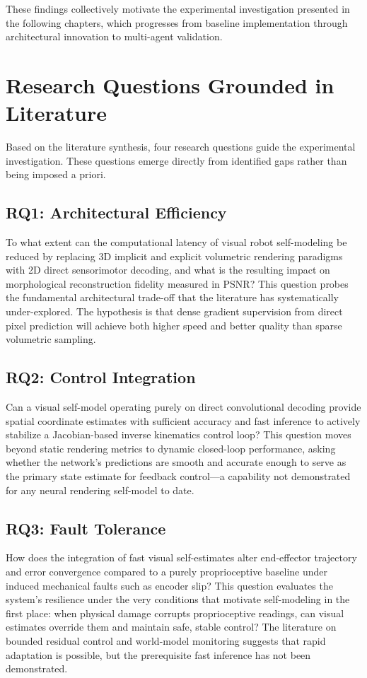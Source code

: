 \documentclass[12pt,a4paper,oneside]{report}
\begin{document}
These findings collectively motivate the experimental investigation presented in the following chapters, which progresses from baseline implementation through architectural innovation to multi-agent validation.
\section{Research Questions Grounded in Literature}

Based on the literature synthesis, four research questions guide the experimental investigation. These questions emerge directly from identified gaps rather than being imposed a priori.
\subsection{RQ1: Architectural Efficiency}
\label{subsec:rq1_architectural_efficiency}

To what extent can the computational latency of visual robot self-modeling be reduced by replacing 3D implicit and explicit volumetric rendering paradigms with 2D direct sensorimotor decoding, and what is the resulting impact on morphological reconstruction fidelity measured in PSNR? This question probes the fundamental architectural trade-off that the literature has systematically under-explored. The hypothesis is that dense gradient supervision from direct pixel prediction will achieve both higher speed and better quality than sparse volumetric sampling.
\subsection{RQ2: Control Integration}
\label{subsec:rq2_control_integration}

Can a visual self-model operating purely on direct convolutional decoding provide spatial coordinate estimates with sufficient accuracy and fast inference to actively stabilize a Jacobian-based inverse kinematics control loop? This question moves beyond static rendering metrics to dynamic closed-loop performance, asking whether the network's predictions are smooth and accurate enough to serve as the primary state estimate for feedback control---a capability not demonstrated for any neural rendering self-model to date.
\subsection{RQ3: Fault Tolerance}
\label{subsec:rq3_fault_tolerance}

How does the integration of fast visual self-estimates alter end-effector trajectory and error convergence compared to a purely proprioceptive baseline under induced mechanical faults such as encoder slip? This question evaluates the system's resilience under the very conditions that motivate self-modeling in the first place: when physical damage corrupts proprioceptive readings, can visual estimates override them and maintain safe, stable control? The literature on bounded residual control and world-model monitoring suggests that rapid adaptation is possible, but the prerequisite fast inference has not been demonstrated.
\end{document}
